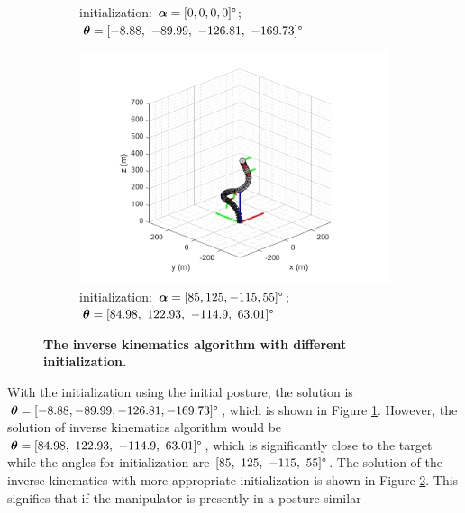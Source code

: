 \begin{figure}[H]
\begin{subfigure}{0.49\textwidth}
        \caption{\centering initialization: $\boldsymbol{\alpha} = [0, 0, 0, 0]\degree$; \\
        $\boldsymbol{\theta} = [-8.88,\ -89.99,\ -126.81,\ -169.73]\degree$ }
        \label{fig:complex_init_0_0_0_0}
    \end{subfigure}
    \begin{subfigure}{0.49\textwidth} %
        \centering
        \includegraphics[width=\linewidth]{Image/MATLAB/manipulator_84.98_122.93_-114.9_63.01.png}
        \caption{\centering initialization: $\boldsymbol{\alpha} = [85, 125, -115, 55]\degree$; \\
        $\boldsymbol{\theta} = [84.98,\ 122.93,\ -114.9,\ 63.01]\degree$ }
        \label{fig:complex_init_85_125_-115_55}
    \end{subfigure}
    \caption[The kinematics model of manipulator with respective bending modules]
    {\centering \textbf{The inverse kinematics algorithm with different initialization.}}
    \label{fig:80_120_-120_90_diff_initial}
\end{figure}
\noindent With the initialization using the initial posture, the solution is 
$\boldsymbol{\theta} = [-8.88, -89.99, -126.81, -169.73]\degree$, which is shown in Figure \ref{fig:complex_init_0_0_0_0}. 
However, the solution of inverse kinematics algorithm would be $\boldsymbol{\theta} = [84.98,\ 122.93,\ -114.9,\ 63.01]\degree$, 
which is significantly close to the target while the angles for initialization are $[85,\ 125,\ -115,\ 55]\degree$. 
The solution of the inverse kinematics with more appropriate initialization is shown in Figure 
\ref{fig:complex_init_85_125_-115_55}. This signifies that if the manipulator is presently in a posture similar 
